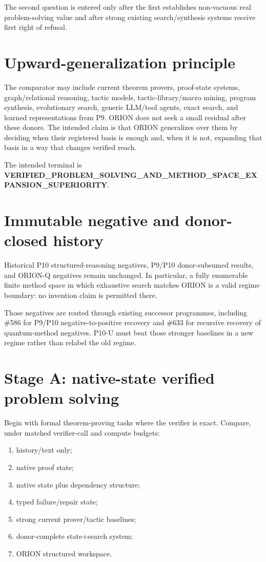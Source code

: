 \documentclass[11pt]{article}
\begin{document}
The second question is entered only after the first establishes non-vacuous real problem-solving value and after strong existing search/synthesis systems receive first right of refusal.

\section{Upward-generalization principle}
The comparator may include current theorem provers, proof-state systems, graph/relational reasoning, tactic models, tactic-library/macro mining, program synthesis, evolutionary search, generic LLM/tool agents, exact search, and learned representations from P9. ORION does not seek a small residual after these donors. The intended claim is that ORION generalizes over them by deciding when their registered basis is enough and, when it is not, expanding that basis in a way that changes verified reach.

The intended terminal is \textbf{VERIFIED_PROBLEM_SOLVING_AND_METHOD_SPACE_EXPANSION_SUPERIORITY}.

\section{Immutable negative and donor-closed history}
Historical P10 structured-reasoning negatives, P9/P10 donor-subsumed results, and ORION-Q negatives remain unchanged. In particular, a fully enumerable finite method space in which exhaustive search matches ORION is a valid regime boundary: no invention claim is permitted there.

Those negatives are routed through existing successor programmes, including \#586 for P9/P10 negative-to-positive recovery and \#633 for recursive recovery of quantum-method negatives. P10-U must beat those stronger baselines in a new regime rather than relabel the old regime.

\section{Stage A: native-state verified problem solving}
Begin with formal theorem-proving tasks where the verifier is exact. Compare, under matched verifier-call and compute budgets:
\begin{enumerate}
    \item history/text only;
    \item native proof state;
    \item native state plus dependency structure;
    \item typed failure/repair state;
    \item strong current prover/tactic baselines;
    \item donor-complete state+search system;
    \item ORION structured workspace.
\end{enumerate}
\end{document}
